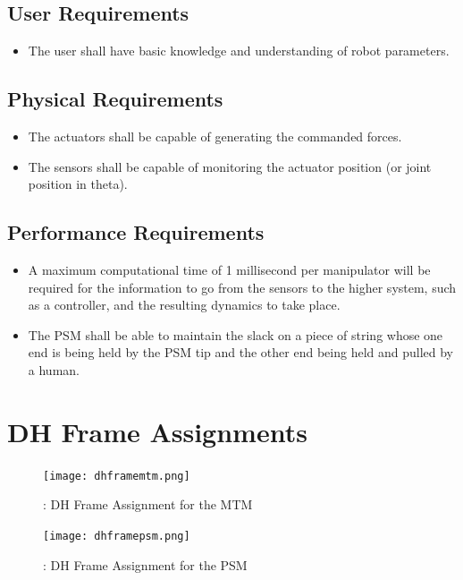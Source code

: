 \documentclass[10pt,journal,compsoc]{IEEEtran}
\begin{document}
\subsection{User Requirements}
\begin{itemize}
  \item The user shall have basic knowledge and understanding of robot parameters.
\end{itemize}

\subsection{Physical Requirements}
\begin{itemize}
  \item The actuators shall be capable of generating the commanded forces.
  \item The sensors shall be capable of monitoring the actuator position (or joint position in theta).
\end{itemize}

\subsection{Performance Requirements}
\begin{itemize}
  \item A maximum computational time of 1 millisecond per manipulator will be required for the information to go from the sensors to the higher system, such as a controller, and the resulting dynamics to take place.
  \item The PSM shall be able to maintain the slack on a piece of string whose one end is being held by the PSM tip and the other end being held and pulled by a human.
\end{itemize}

\section{DH Frame Assignments}

\begin{figure}[htbp]
\begin{center}
\texttt{[image: dhframemtm.png]}
\caption{: DH Frame Assignment for the MTM}
\label{fig:dhframemtm}
\end{center}
\end{figure}

\begin{figure}[htbp]
\begin{center}
\texttt{[image: dhframepsm.png]}
\caption{: DH Frame Assignment for the PSM}
\label{fig:dhframepsm}
\end{center}
\end{figure}





\end{document}
